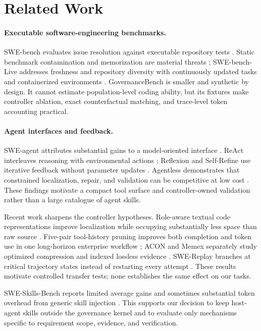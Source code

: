 \documentclass[10pt,twocolumn]{article}
\begin{document}
\section{Related Work}

\paragraph{Executable software-engineering benchmarks.}
SWE-bench evaluates issue resolution against executable repository tests
\citep{jimenez2024swebench}. Static benchmark contamination and memorization
are material threats \citep{liang2025illusion}; SWE-bench-Live addresses
freshness and repository diversity with continuously updated tasks and
containerized environments \citep{zhang2025swebenchlive}. GovernanceBench is
smaller and synthetic by design. It cannot estimate population-level coding
ability, but its fixtures make controller ablation, exact counterfactual
matching, and trace-level token accounting practical.

\paragraph{Agent interfaces and feedback.}
SWE-agent attributes substantial gains to a model-oriented interface
\citep{yang2024sweagent}. ReAct interleaves reasoning with environmental
actions \citep{yao2023react}; Reflexion and Self-Refine use iterative feedback
without parameter updates \citep{shinn2023reflexion,madaan2023selfrefine}.
Agentless demonstrates that constrained localization, repair, and validation
can be competitive at low cost \citep{xia2024agentless}. These findings
motivate a compact tool surface and controller-owned validation rather than a
large catalogue of agent skills.

Recent work sharpens the controller hypotheses. Role-aware textual code
representations improve localization while occupying substantially less space
than raw source \citep{caumartin2026retrieval}. Five-pair tool-history pruning
improves both completion and token use in one long-horizon enterprise workflow
\citep{lodha2026lesscontext}; ACON and Memex separately study optimized
compression and indexed lossless evidence \citep{kang2025acon,
wang2026memex}. SWE-Replay branches at critical trajectory states instead of
restarting every attempt \citep{ding2026swereplay}. These results motivate
controlled transfer tests; none establishes the same effect on our tasks.

SWE-Skills-Bench reports limited average gains and sometimes substantial token
overhead from generic skill injection \citep{han2026sweskills}. This supports
our decision to keep host-agent skills outside the governance kernel and to
evaluate only mechanisms specific to requirement scope, evidence, and
verification.
\end{document}
